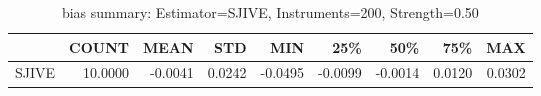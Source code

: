 \begin{table}[ht]
\centering
\caption{bias summary: Estimator=SJIVE, Instruments=200, Strength=0.50}
\begin{tabular}{lrrrrrrrr}
\toprule
 & COUNT & MEAN & STD & MIN & 25\% & 50\% & 75\% & MAX \\
\midrule
SJIVE & 10.0000 & -0.0041 & 0.0242 & -0.0495 & -0.0099 & -0.0014 & 0.0120 & 0.0302 \\
\bottomrule
\end{tabular}
\end{table}
